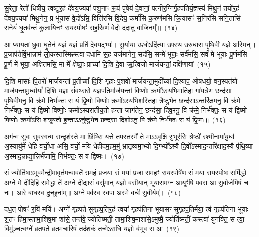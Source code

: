 सु॒रेता॒ रेतो॑ धिषीय॒ त्वष्टु॑र॒हं दे॑वय॒ज्यया॑ पशू॒नाꣳ रू॒पं पु॑षेयं दे॒वानां॒ पत्नी॑र॒ग्निर्गृ॒ह\-प॑तिर्य॒ज्ञस्य॑ मिथु॒नं तयो॑र॒हं दे॑वय॒ज्यया॑ मिथु॒नेन॒ प्र भू॑यासं वे॒दो॑\-ऽसि॒ वित्ति॑रसि वि॒देय॒ कर्मा॑सि क॒रुण॑मसि क्रि॒यासꣳ॑ स॒निर॑सि सनि॒तासि॑ स॒नेयं॑ घृ॒तव॑न्तं कुला॒यिनꣳ॑ रा॒यस्पोषꣳ॑ सह॒स्रिणं॑ वे॒दो द॑दातु वा॒जिनम्᳚॥~(१४)

{\anuvakamend[{इन्द्र॑स्या॒हमिन्द्र॑वन्तः॒ सोम॑स्या॒हं दे॑वय॒ज्यया॒ चतु॑श्चत्वारिꣳशच्च}]}%

आ प्या॑यतां ध्रु॒वा घृ॒तेन॑ य॒ज्ञं य॑ज्ञं॒ प्रति॑ देव॒यद्भ्यः॑। सू॒र्याया॒ ऊधो\-ऽदि॑त्या उ॒पस्थ॑ उ॒रुधा॑रा पृथि॒वी य॒ज्ञे अ॒स्मिन्॥ प्र॒जाप॑तेर्वि॒भान्नाम॑ लो॒कस्तस्मिꣴ॑स्त्वा दधामि स॒ह यज॑मानेन॒ सद॑सि॒ सन्मे॑ भूयाः॒ सर्व॑मसि॒ सर्वं॑ मे भूयाः पू॒र्णम॑सि पू॒र्णं मे॑ भूया॒ अक्षि॑तमसि॒ मा मे᳚ क्षेष्ठाः॒ प्राच्यां᳚ दि॒शि दे॒वा ऋ॒त्विजो॑ मार्जयन्तां॒ दक्षि॑णायां~(१५)

दि॒शि मासाः᳚ पि॒तरो॑ मार्जयन्तां प्र॒तीच्यां᳚ दि॒शि गृ॒हाः प॒शवो॑ मार्जयन्ता॒मुदी᳚च्यां दि॒श्याप॒ ओष॑धयो॒ वन॒स्पत॑यो मार्जयन्तामू॒र्ध्वायां᳚ दि॒शि य॒ज्ञः सं॑वथ्स॒रो य॒ज्ञप॑तिर्मार्जयन्तां॒ विष्णोः॒ क्रमो᳚\-ऽस्यभिमाति॒हा गा॑य॒त्रेण॒ छन्द॑सा पृथि॒वीमनु॒ वि क्र॑मे॒ निर्भ॑क्तः॒ स यं द्वि॒ष्मो विष्णोः॒ क्रमो᳚\-ऽस्यभिशस्ति॒हा त्रैष्टु॑भेन॒ छन्द॑सा॒\-ऽन्तरि॑क्ष॒मनु॒ वि क्र॑मे॒ निर्भ॑क्तः॒ स यं द्वि॒ष्मो विष्णोः॒ क्रमो᳚\-ऽस्यरातीय॒तो ह॒न्ता जाग॑तेन॒ छन्द॑सा॒ दिव॒मनु॒ वि क्र॑मे॒ निर्भ॑क्तः॒ स यं द्वि॒ष्मो विष्णोः॒ क्रमो॑\-ऽसि शत्रूय॒तो ह॒न्ता\-ऽ\-ऽनु॑ष्टुभेन॒ छन्द॑सा॒ दिशो\-ऽनु॒ वि क्र॑मे॒ निर्भ॑क्तः॒ स यं द्वि॒ष्मः॥~(१६)

{\anuvakamend[{दक्षि॑णायां द्वि॒ष्मो विष्णो॒रेका॒न्नत्रि॒ꣳ॒शच्च॑}]}%

अग॑न्म॒ सुवः॒ सुव॑रगन्म स॒न्दृश॑स्ते॒ मा छि॑थ्सि॒ यत्ते॒ तप॒स्तस्मै॑ ते॒ मा\-ऽ\-ऽवृ॑क्षि सु॒भूर॑सि॒ श्रेष्ठो॑ रश्मी॒नामा॑यु॒र्धा अ॒स्यायु॑र्मे धेहि वर्चो॒धा अ॑सि॒ वर्चो॒ मयि॑ धेही॒दम॒हम॒मुं भ्रातृ॑व्यमा॒भ्यो दि॒ग्भ्यो᳚\-ऽस्यै दि॒वो᳚\-ऽस्माद॒न्तरि॑क्षाद॒स्यै पृ॑थि॒व्या अ॒स्मा\-द॒न्नाद्या॒न्निर्भ॑जामि॒ निर्भ॑क्तः॒ स यं द्वि॒ष्मः।~(१७)

सं ज्योति॑षा\-ऽभूवमै॒न्द्रीमा॒वृत॑\-म॒न्वाव॑र्ते॒ सम॒हं प्र॒जया॒ सं मया᳚ प्र॒जा सम॒हꣳ रा॒यस्पोषे॑ण॒ सं मया॑ रा॒यस्पोषः॒ समि॑द्धो अग्ने मे दीदिहि समे॒द्धा ते॑ अग्ने दीद्यासं॒ वसु॑मान् य॒ज्ञो वसी॑यान् भूयास॒मग्न॒ आयूꣳ॑षि पवस॒ आ सु॒वोर्ज॒मिषं॑ च नः। आ॒रे बा॑धस्व दु॒च्छुना᳚म्॥ अग्ने॒ पव॑स्व॒ स्वपा॑ अ॒स्मे वर्चः॑ सु॒वीर्यम्᳚।~(१८)

दध॒त् पोषꣳ॑ र॒यिं मयि॑। अग्ने॑ गृहपते सुगृहप॒तिर॒हं त्वया॑ गृ॒हप॑तिना भूयासꣳ सुगृहप॒तिर्मया॒ त्वं गृ॒हप॑तिना भूयाः श॒तꣳ हिमा॒स्तामा॒शिष॒मा शा॑से॒ तन्त॑वे॒ ज्योति॑ष्मतीं॒ तामा॒शिष॒माशा॑से॒\-ऽमुष्मै॒ ज्योति॑ष्मतीं॒ कस्त्वा॑ युनक्ति॒ स त्वा॒ विमु॑ञ्च॒त्वग्ने᳚ व्रतपते व्र॒तम॑चारिषं॒ तद॑शकं॒ तन्मे॑\-ऽराधि य॒ज्ञो ब॑भूव॒ स आ~(१९)

